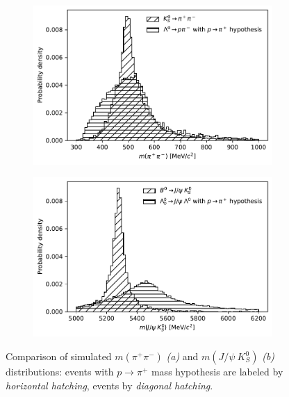 \label{sec:B0_veto}
\begin{figure}[t]
	\centering
	\begin{subfigure}{.45\textwidth}
		\includegraphics[width=\textwidth]{graphics/04-event_selection/phys_bkg_ks_comparison.pdf}
		\caption{}
		\label{fig:4:phys_bkg_ks}
	\end{subfigure}
	\begin{subfigure}{.45\textwidth}
		\includegraphics[width=\textwidth]{graphics/04-event_selection/phys_bkg_b0_comparison.pdf}
		\caption{}
		\label{fig:4:phys_bkg_b0}
	\end{subfigure}
	\caption{Comparison of simulated $m(\pi^+\pi^-)$ \textit{(a)} and $m(J/\psi~K^0_S)$ \textit{(b)} distributions: \demonstratorshort events with $p\rightarrow \pi^+$ mass hypothesis are labeled by \textit{horizontal hatching}, \physbkgshort events by \textit{diagonal hatching}.}
	\label{fig:4:phys_bkg_distributions}
\end{figure}

